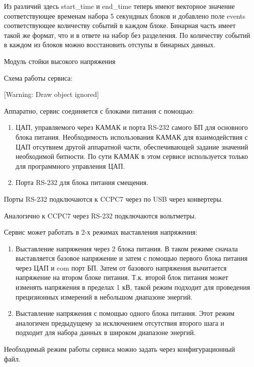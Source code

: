\documentclass{article}
\begin{document}
Из различий здесь start\_time и end\_time теперь имеют векторное значение соответствующее временам набора 5 секундных блоков и добавлено поле events соответствующее количеству событий в каждом блоке. Бинарная часть имеет такой же формат, что и в ответе на набор без разделения. По количеству событий в каждом из блоков можно восстановить отступы в бинарных данных.

Модуль стойки высокого напряжения

Схема работы сервиса:

[Warning: Draw object ignored]

Аппаратно, сервис соединяется с блоками питания с помощью:

\begin{enumerate}
\item ЦАП, управляемого через КАМАК и порта RS-232 самого БП для основного блока питания. Необходимость использования КАМАК для взаимодействия с ЦАП отсутвием другой аппаратной части, обеспечивающей задание значений необходимой битности. По сути КАМАК в этом сервисе используется только для программного управления ЦАП.
\item Порта RS-232 для блока питания смещения.
\end{enumerate}
Порты RS-232 подключаются к CCPC7 через по USB через конвертеры.

Аналогично к CCPC7 через RS-232 подключаются вольтметры.


\bigskip

Сервис может работать в 2-х режимах выставления напряжения:

\begin{enumerate}
\item Выставление напряжения через 2 блока питания. В таком режиме сначала выставляется базовое напряжение и затем с помощью первого блока питания через ЦАП и com порт БП. Затем от базового напряжения вычитается напряжение на втором блоке питания. Т.к. второй блок питания может изменять напряжения в пределах 1 кВ, такой режим подходит для проведения прецизионных измерений в небольшом диапазоне энергий.
\item Выставление напряжения с помощью одного блока питания. Этот режим аналогичен предыдущему за исключением отсутствия второго шага и подходит для набора данных в широком диапазоне энергий.
\end{enumerate}
Необходимый режим работы сервиса можно задать через конфигурационный файл.


\bigskip
\end{document}
